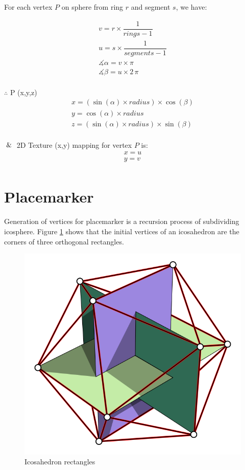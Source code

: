 For each vertex $P$ on sphere from ring $r$ and segment $s$, we have:

\[
\begin{array}{lr}
v = r \times  \dfrac{1}{rings - 1}\\
u = s \times  \dfrac{1}{segments - 1}\\
\measuredangle \alpha = v \times \pi\\
\measuredangle \beta = u \times 2\,\pi\\
\end{array}
\]

$\therefore$ P (x,\;y,\;z)
\[
\begin{array}{lr}
x = (\sin(\alpha) \times radius) \times \cos(\beta)\\
y = \cos(\alpha) \times radius\\
z =  (\sin(\alpha) \times radius) \times \sin(\beta)\\
\end{array}
\]

$\And$ 2D Texture (x,\;y) mapping for vertex $P$ is:
\[
\begin{array}{lr}
x = u\\
y = v\\
\end{array}
\]

\section{Placemarker}

Generation of vertices for placemarker is a recursion process of subdividing icosphere. Figure \ref{fig:icosahedron-rectangles} shows that the initial vertices of an icosahedron are the corners of three orthogonal rectangles.

\begin{figure}[H]
\caption{Icosahedron rectangles \cite{wiki.icosahedron-rectangles.2006}}
\label{fig:icosahedron-rectangles}
\centering
\includegraphics[width=\linewidth]{Figures/icosahedron-rectangles.png}
\decoRule
\end{figure}

